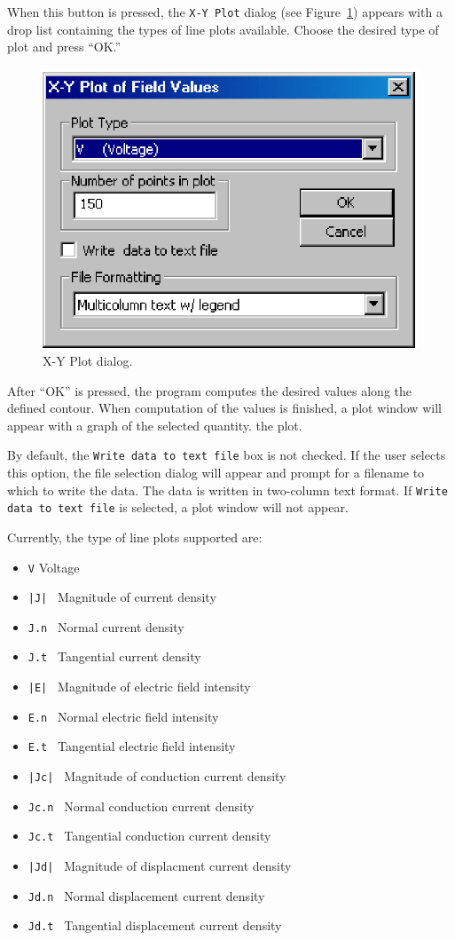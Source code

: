 When this button is pressed, the \texttt{X-Y Plot} dialog (see
Figure~\ref{cfig19}) appears with a drop list containing the types
of line plots available. Choose the desired type of plot and press
``OK.''

\begin{figure}[htbp]
\centerline{\includegraphics{cd6.ps}}
\caption{X-Y Plot dialog.}
\label{cfig19}
\end{figure}

After ``OK'' is pressed, the program computes the desired values
along the defined contour. When computation of the values is finished,
a plot window will appear with a graph of the selected quantity.
the plot.

By default, the \texttt{Write data to text file} box is not
checked. If the user selects this option, the file selection dialog
will appear and prompt for a filename to which to write the data.
The data is written in two-column text format. If \texttt{Write
data to text file} is selected, a plot window will not appear.

Currently, the type of line plots supported are: 
\begin{itemize}
    \item {\tt V}      Voltage
	\item {\tt |J|   } Magnitude of current density
	\item {\tt J.n } Normal current density
	\item {\tt J.t } Tangential current density
	\item {\tt |E|   } Magnitude of electric field intensity
	\item {\tt E.n } Normal electric field intensity
	\item {\tt E.t } Tangential electric field intensity
	\item {\tt |Jc|   } Magnitude of conduction current density
	\item {\tt Jc.n } Normal conduction current density
	\item {\tt Jc.t } Tangential conduction current density
	\item {\tt |Jd|   } Magnitude of displacment current density
	\item {\tt Jd.n } Normal displacement current density
	\item {\tt Jd.t } Tangential displacement current density
\end{itemize}
